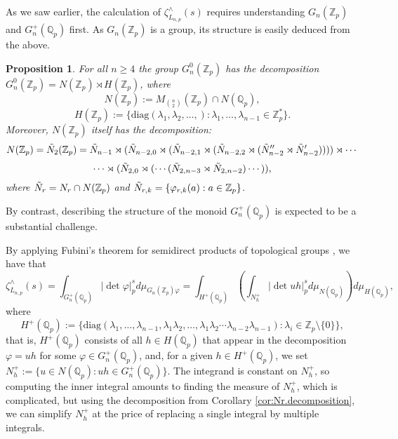 \documentclass{article}
\newtheorem{proposition2}[theorem2]{Proposition}
\begin{document}
As we saw earlier, the calculation of $\zeta_{L_{n,p}}^{\wedge}(s)$ requires understanding $G_{n}(\mathbb{Z}_p)$ and $G_{n}^{+}(\mathbb{Q}_p)$ first. As $G_{n}(\mathbb{Z}_{p})$ is a group, its structure is easily deduced from the above.
\begin{proposition2}
\label{prop:G.n.Zp.decomposition}
For all $n\geq{4}$ the group $G_{n}^{0}(\mathbb{Z}_{p})$ has the decomposition $G_{n}^{0}(\mathbb{Z}_{p})=N(\mathbb{Z}_{p})\rtimes{H(\mathbb{Z}_{p})}$, where \[N(\mathbb{Z}_{p}):=M_{\binom{n}{2}}(\mathbb{Z}_{p})\cap{N(\mathbb{Q}_{p})},\]
\[H(\mathbb{Z}_{p}):=\{\mathrm{diag}(\lambda_{1},\lambda_{2},\dots,) : \lambda_1,\dots,\lambda_{n-1}\in\mathbb{Z}_{p}^{\ast}\}.\]
Moreover, $N(\mathbb{Z}_{p})$ itself has the decomposition: \[N(\mathbb{Z}_{p})=\Tilde{N}_{2}(\mathbb{Z}_{p})=
\Tilde{N}_{n-1}\rtimes({\Tilde{N}_{n-2,0}}\rtimes(\Tilde{N}_{n-2,1}\rtimes(\Tilde{N}_{n-2,2}\rtimes(\Tilde{N}''_{n-2}\rtimes{\Tilde{N}'_{n-2}}))))\rtimes\cdots\]\[\cdots\rtimes{(\Tilde{N}_{2,0}\rtimes(\cdots(\Tilde{N}_{2,n-3}\rtimes{\Tilde{N}_{2,n-2}})\cdots))}
,\]
where $\Tilde{N}_{r}=N_{r}\cap{N(\mathbb{Z}_{p})}$ and $\Tilde{N}_{r,k}=\{\varphi_{r,k}(a) : a\in\mathbb{Z}_{p}\}$.
\end{proposition2}
By contrast, describing the structure of the monoid $G_{n}^{+}(\mathbb{Q}_p)$ is expected to be a substantial challenge.

By applying Fubini's theorem for semidirect products of topological groups \cite[Proposition 28]{Nachbin}, we have that \[\zeta_{L_{n,p}}^{\wedge}(s)=\displaystyle\int_{G_{n}^{+}(\mathbb{Q}_p)}|\det{\varphi}|_p^sd\mu_{G_{n}(\mathbb{Z}_p)\varphi}=\displaystyle\int_{H^+(\mathbb{Q}_p)}\left(\displaystyle\int_{N_{h}^+}|\det{uh}|_p^sd\mu_{N(\mathbb{Q}_p)}\right)d\mu_{H(\mathbb{Q}_p)},\]
where \[H^+(\mathbb{Q}_p):=\{\mathrm{diag}(\lambda_{1},\dots,\lambda_{n-1},\lambda_{1}\lambda_{2},\dots,\lambda_{1}\lambda_{2}\cdots\lambda_{n-2}\lambda_{n-1}) : \lambda_{i}\in\mathbb{Z}_{p}\setminus\{0\}\},\]
that is, $H^+(\mathbb{Q}_p)$ consists of all $h\in{H(\mathbb{Q}_{p})}$ that appear in the decomposition $\varphi=uh$ for some $\varphi\in{G_{n}^{+}(\mathbb{Q}_{p})}$, and, for a given $h\in{H^{+}(\mathbb{Q}_{p})}$, we set $N_{h}^{+}:=\{u\in{N(\mathbb{Q}_{p}) : uh\in{G_{n}^{+}(\mathbb{Q}_{p})}}\}$. The integrand is constant on $N_{h}^{+}$, so computing the inner integral amounts to finding the measure of $N_{h}^+$, which is complicated, but using the decomposition from Corollary \ref{cor:Nr.decomposition}, we can simplify $N_{h}^{+}$ at the price of replacing a single integral by multiple integrals.
\end{document}
